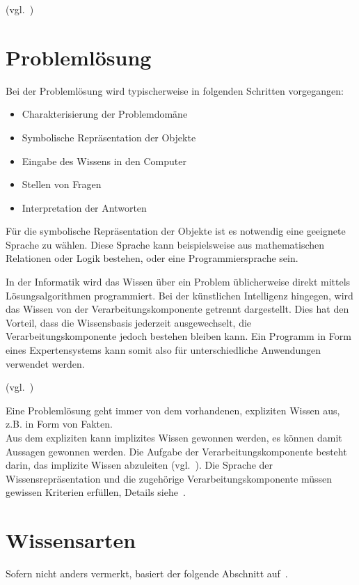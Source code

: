 (vgl.~\cite[S. 23]{laemmel})

\newpage

\section{Problemlösung}
\label{sec:experten_systeme_problemloesung}
Bei der Problemlösung wird typischerweise in folgenden Schritten vorgegangen:
\begin{itemize}
    \item Charakterisierung der Problemdomäne
    \item Symbolische Repräsentation der Objekte
    \item Eingabe des Wissens in den Computer
    \item Stellen von Fragen
    \item Interpretation der Antworten
\end{itemize}

Für die symbolische Repräsentation der Objekte ist es notwendig eine geeignete Sprache zu wählen. Diese Sprache kann beispielsweise aus mathematischen Relationen oder Logik bestehen, oder eine Programmiersprache sein.

In der Informatik wird das Wissen über ein Problem üblicherweise direkt mittels Lösungsalgorithmen programmiert. Bei der künstlichen Intelligenz hingegen, wird das Wissen von der Verarbeitungskomponente getrennt dargestellt. Dies hat den Vorteil, dass die Wissensbasis jederzeit ausgewechselt, die Verarbeitungskomponente jedoch bestehen bleiben kann. Ein Programm in Form eines Expertensystems kann somit also für unterschiedliche Anwendungen verwendet werden.

(vgl.~\cite[S. 28 - 30]{laemmel})

Eine Problemlösung geht immer von dem vorhandenen, expliziten Wissen aus, z.B. in Form von Fakten.\\
Aus dem expliziten kann implizites Wissen gewonnen werden, es können damit Aussagen gewonnen werden. Die Aufgabe der Verarbeitungskomponente besteht darin, das implizite Wissen abzuleiten (vgl.~\cite[S. 30 - 31]{laemmel}). Die Sprache der Wissensrepräsentation und die zugehörige Verarbeitungskomponente müssen gewissen Kriterien erfüllen, Details siehe~\cite[S. 31]{laemmel}.

\section{Wissensarten}
\label{sec:experten_systeme_wissensarten}
Sofern nicht anders vermerkt, basiert der folgende Abschnitt auf~\cite[S. 30 - 31]{laemmel}.

